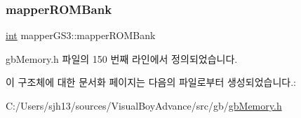 \subsubsection{\texorpdfstring{mapper\+R\+O\+M\+Bank}{mapperROMBank}}
{\footnotesize\ttfamily \mbox{\hyperlink{_util_8cpp_a0ef32aa8672df19503a49fab2d0c8071}{int}} mapper\+G\+S3\+::mapper\+R\+O\+M\+Bank}



gb\+Memory.\+h 파일의 150 번째 라인에서 정의되었습니다.



이 구조체에 대한 문서화 페이지는 다음의 파일로부터 생성되었습니다.\+:\begin{DoxyCompactItemize}
\item 
C\+:/\+Users/sjh13/sources/\+Visual\+Boy\+Advance/src/gb/\mbox{\hyperlink{gb_memory_8h}{gb\+Memory.\+h}}\end{DoxyCompactItemize}
